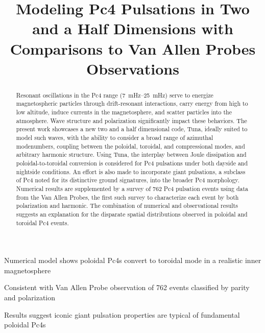 \documentclass[draft,linenumbers]{agujournal}
\begin{document}

\title{Modeling Pc4 Pulsations in Two and a Half Dimensions with Comparisons to Van Allen Probes Observations}




\begin{keypoints}
\item Numerical model shows poloidal Pc4s convert to toroidal mode in a realistic inner magnetosphere
\item Consistent with Van Allen Probe observation of 762 events classified by parity and polarization
\item Results suggest iconic giant pulsation properties are typical of fundamental poloidal Pc4s
\end{keypoints}


\begin{abstract}
Resonant oscillations in the Pc4 range (\SIrange{7}{25}{\mHz}) serve to energize magnetospheric particles through drift-resonant interactions, carry energy from high to low altitude, induce currents in the magnetosphere, and scatter particles into the atmosphere. Wave structure and polarization significantly impact these behaviors. The present work showcases a new two and a half dimensional code, Tuna, ideally suited to model such waves, with the ability to consider a broad range of azimuthal modenumbers, coupling between the poloidal, toroidal, and compressional modes, and arbitrary harmonic structure. Using Tuna, the interplay between Joule dissipation and poloidal-to-toroidal conversion is considered for Pc4 pulsations under both dayside and nightside conditions. An effort is also made to incorporate giant pulsations, a subclass of Pc4 noted for its distinctive ground signatures, into the broader Pc4 morphology. Numerical results are supplemented by a survey of 762 Pc4 pulsation events using data from the Van Allen Probes, the first such survey to characterize each event by both polarization and harmonic. The combination of numerical and observational results suggests an explanation for the disparate spatial distributions observed in poloidal and toroidal Pc4 events.
\end{abstract}
\end{document}
